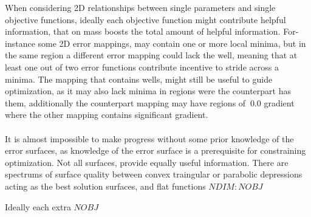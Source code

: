      
   When considering 2D relationships between single parameters and single objective functions, ideally each objective function might contribute helpful information, that on mass boosts the total amount of helpful information. For-instance some 2D error mappings, may contain one or more local minima, but in the same region a different error mapping could lack the well, meaning that at least one out of two error functions contribute incentive to stride across a minima. The mapping that contains wells, might still be useful to guide optimization, as it may also lack minima in regions were the counterpart has them, additionally the counterpart mapping may have regions of $~0.0$ gradient where the other mapping contains significant gradient.\\
   \\
   It is almost impossible to make progress without some prior knowledge of the error surfaces, as knowledge of the error surface is a prerequisite for constraining optimization. Not all surfaces, provide equally useful information. There are spectrums of surface quality between convex traingular or parabolic depressions acting as the best solution surfaces, and flat functions 
   $NDIM:NOBJ$
   
   Ideally each extra $NOBJ$  

